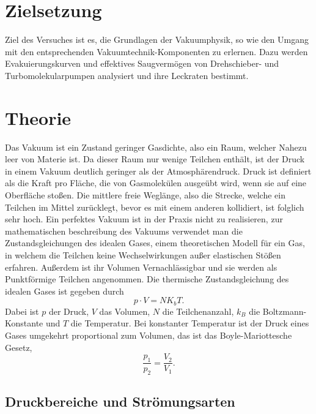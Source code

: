 
\section{Zielsetzung}
\label{sec:Zielsetzung}
Ziel des Versuches ist es, die Grundlagen der Vakuumphysik, so wie den Umgang mit
den entsprechenden Vakuumtechnik-Komponenten zu erlernen. Dazu werden Evakuierungskurven und effektives Saugvermögen 
von Drehschieber- und Turbomolekularpumpen analysiert und ihre Leckraten bestimmt.


\section{Theorie}
\label{sec:Theorie}

Das Vakuum ist ein Zustand geringer Gasdichte, also ein Raum, welcher Nahezu leer von Materie ist.
Da dieser Raum nur wenige Teilchen enthält, ist der Druck in einem Vakuum deutlich geringer als der Atmosphärendruck.
Druck ist definiert als die Kraft pro Fläche, die von Gasmolekülen ausgeübt wird, wenn sie auf
eine Oberfläche stoßen. Die mittlere freie Weglänge, also die Strecke, welche ein Teilchen im Mittel zurücklegt, bevor es
mit einem anderen kollidiert, ist folglich sehr hoch. Ein perfektes Vakuum ist in der Praxis nicht zu realisieren, zur mathematischen 
beschreibung des Vakuums verwendet man die Zustandsgleichungen des idealen Gases, einem theoretischen Modell für ein 
Gas, in welchem die Teilchen keine Wechselwirkungen außer elastischen Stößen erfahren. Außerdem ist ihr Volumen Vernachlässigbar 
und sie werden als Punktförmige Teilchen angenommen.
Die thermische Zustandsgleichung des idealen Gases ist gegeben durch
\begin{equation}
     p \cdot V=NK_bT .
\end{equation}  
Dabei ist \( p \) der Druck, \( V \) das Volumen, \( N \) die Teilchenanzahl, \( k_B \) die Boltzmann-Konstante
 und \( T \) die Temperatur.
Bei konstanter Temperatur ist der Druck eines Gases umgekehrt proportional zum Volumen, das ist das Boyle-Mariottesche Gesetz,
\begin{equation}
    \frac{p_1}{p_2}=  \frac{V_2}{V_1}.
\end{equation}


\subsection{Druckbereiche und Strömungsarten}


